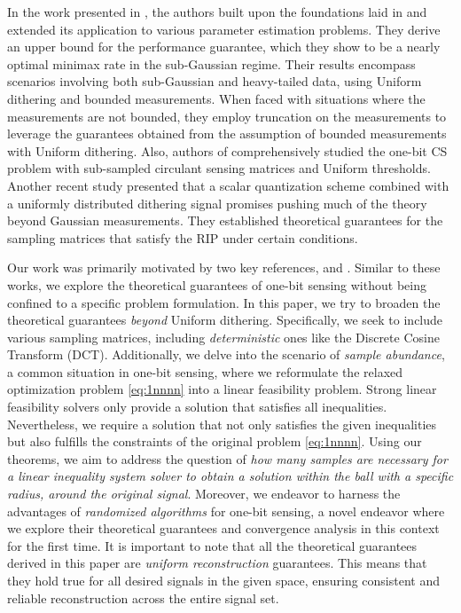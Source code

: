 \documentclass[12pt,draftcls,onecolumn]{IEEEtran}
\newcommand{\Fr}[1]{\textcolor{blue}{#1}}
\begin{document}
In the work presented in \cite{chen2023high}, the authors built upon the foundations laid in \cite{thrampoulidis2020generalized} and extended its application to various parameter estimation problems. They derive an upper bound for the performance guarantee, which they show to be a nearly optimal minimax rate in the sub-Gaussian regime. Their results encompass scenarios involving both sub-Gaussian and heavy-tailed data, using Uniform dithering and bounded measurements.
When faced with situations where the measurements are not bounded, they employ truncation on the measurements to leverage the guarantees obtained from the assumption of bounded measurements with Uniform dithering. 
Also, authors of \cite{dirksen2018robust} comprehensively studied the one-bit CS problem with sub-sampled circulant sensing matrices and Uniform thresholds. 
Another recent study \cite{xu2020quantized} presented that a scalar quantization scheme combined with a uniformly
distributed dithering signal promises pushing much of the
theory beyond Gaussian measurements. They established theoretical guarantees for the sampling matrices that satisfy the RIP under certain conditions. 

Our work was primarily motivated by two key references, \cite{xu2020quantized} and \cite{dirksen2021non}. Similar to these works, we explore the theoretical guarantees of one-bit sensing without being confined to a specific problem formulation. In this paper, we try to broaden the theoretical guarantees \emph{beyond} Uniform dithering. Specifically, we seek to include various sampling matrices, including \emph{deterministic} ones like the Discrete Cosine Transform (DCT).
Additionally, we delve into the scenario of \emph{sample abundance}, a common situation in one-bit sensing, where we reformulate the relaxed optimization problem \eqref{eq:1nnnn} into a linear feasibility problem. Strong linear feasibility solvers only provide a solution that satisfies all inequalities. Nevertheless, we require a solution that not only satisfies the given inequalities but also fulfills the constraints of the original problem \eqref{eq:1nnnn}.
Using our theorems, we aim to address the question of \emph{how many samples are necessary for a linear inequality system solver to obtain a solution within the ball with a specific radius, around the original signal}. 
Moreover, we endeavor to harness the advantages of \emph{randomized algorithms} for one-bit sensing, a novel endeavor where we explore their theoretical guarantees and convergence analysis in this context for the first time. 
It is important to note that all the theoretical guarantees derived in this paper are \emph{uniform reconstruction} guarantees. This means that they hold true for all desired signals in the given space, ensuring consistent and reliable reconstruction across the entire signal set.
\end{document}
